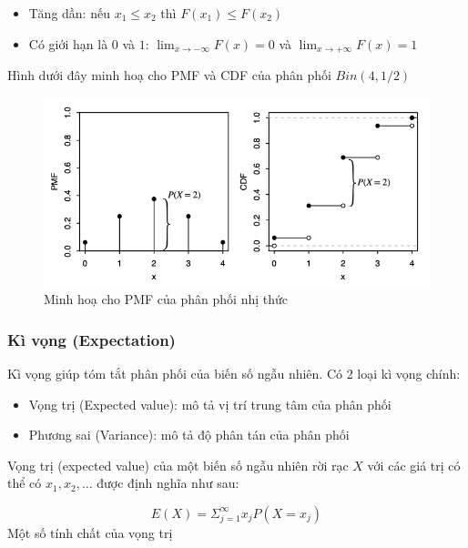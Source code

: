 \documentclass[
]{book}
\providecommand{\tightlist}{%
  \setlength{\itemsep}{0pt}\setlength{\parskip}{0pt}}
\begin{document}
\begin{itemize}
\tightlist
\item
  Tăng dần: nếu \(x_1 \leq x_2\) thì \(F(x_1) \leq F(x_2)\)
\item
  Có giới hạn là \(0\) và \(1\): \(\lim_{x\rightarrow -\infty}F(x) = 0\) và \(\lim_{x\rightarrow +\infty}F(x) = 1\)
\end{itemize}

Hình dưới đây minh hoạ cho PMF và CDF của phân phối \(Bin(4, 1/2)\)

\begin{figure}

{\centering \includegraphics[width=1\linewidth]{figures/Picture10} 

}

\caption{Minh hoạ cho PMF của phân phối nhị thức}\label{fig:unnamed-chunk-6}
\end{figure}

\hypertarget{kuxec-vux1ecdng-expectation}{%
\subsubsection{Kì vọng (Expectation)}\label{kuxec-vux1ecdng-expectation}}

Kì vọng giúp tóm tắt phân phối của biến số ngẫu nhiên. Có 2 loại kì vọng chính:

\begin{itemize}
\tightlist
\item
  Vọng trị (Expected value): mô tả vị trí trung tâm của phân phối
\item
  Phương sai (Variance): mô tả độ phân tán của phân phối
\end{itemize}

Vọng trị (expected value) của một biến số ngẫu nhiên rời rạc \(X\) với các giá trị có thể có \(x_1, x_2, \ldots\) được định nghĩa như sau:

\[
E(X) = \Sigma^\infty_{j = 1} x_j P(X = x_j)
\]
Một số tính chất của vọng trị
\end{document}
